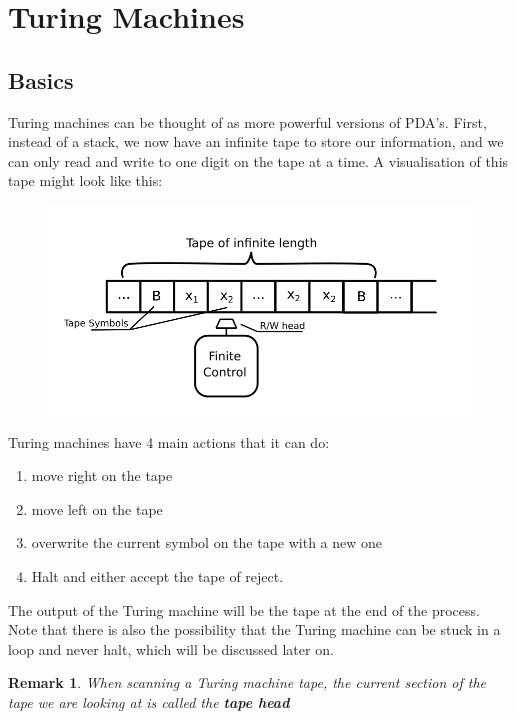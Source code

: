 \documentclass[12pt, letterpaper]{article}
\newtheorem*{rem}{Remark}
\begin{document}
\section{Turing Machines}



\subsection{Basics}



Turing machines can be thought of as more powerful versions of PDA's. First, instead of a stack, we now have an infinite tape to store our information, and we can only read and write to one digit on the tape at a time. A visualisation of this tape might look like this:
\begin{center}
\begin{figure}[h!]
	\includegraphics[scale=0.5]{tape.png}
\end{figure}
\end{center}
Turing machines have 4 main actions that it can do:
\begin{enumerate}
\item move right on the tape
\item move left on the tape
\item overwrite the current symbol on the tape with a new one
\item Halt and either accept the tape of reject.
\end{enumerate}

The output of the Turing machine will be the tape at the end of the process. Note that there is also the possibility that the Turing machine can be stuck in a loop and never halt, which will be discussed later on.\\

\begin{rem}
When scanning a Turing machine tape, the current section of the tape we are looking at is called the \textbf{tape head}
\end{rem}
\end{document}
